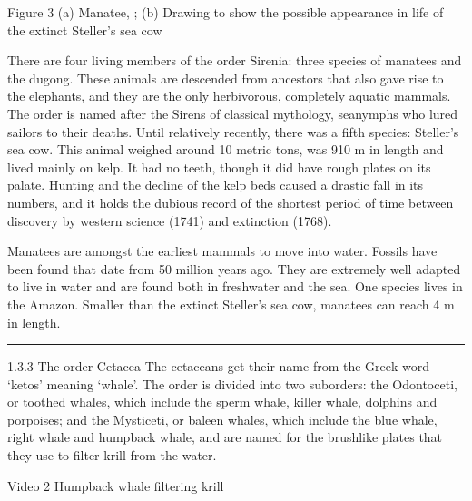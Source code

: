 \documentclass[letterpaper,10pt,english]{sphinxmanual}
\let\sphinxpxdimen\pdfpxdimen\else\newdimen\sphinxpxdimen
\begin{document}
\sphinxincludegraphics[width=512\sphinxpxdimen,height=164\sphinxpxdimen]{{s182_11_figure_3_composite}.jpg}

Figure 3 (a) Manatee, ; (b) Drawing to show the possible appearance in life of the extinct Steller’s sea cow

There are four living members of the order Sirenia: three species of manatees and the dugong. These animals are descended from ancestors that also gave rise to the elephants, and they are the only herbivorous, completely aquatic mammals. The order is named after the Sirens of classical mythology, sea\sphinxhyphen{}nymphs who lured sailors to their deaths. Until relatively recently, there was a fifth species: Steller’s sea cow. This animal weighed around 10 metric tons, was 9\textendash{}10 m in length and lived mainly on
kelp. It had no teeth, though it did have rough plates on its palate. Hunting and the decline of the kelp beds caused a drastic fall in its numbers, and it holds the dubious record of the shortest period of time between discovery by western science (1741) and extinction (1768).

Manatees are amongst the earliest mammals to move into water. Fossils have been found that date from 50 million years ago. They are extremely well adapted to live in water and are found both in freshwater and the sea. One species lives in the Amazon. Smaller than the extinct Steller’s sea cow, manatees can reach 4 m in length.


\bigskip\hrule\bigskip


1.3.3 The order Cetacea The cetaceans get their name from the Greek word ‘ketos’ meaning ‘whale’. The order is divided into two suborders: the Odontoceti, or toothed whales, which include the sperm whale, killer whale, dolphins and porpoises; and the Mysticeti, or baleen whales, which include the blue whale, right whale and humpback whale, and are named for the brush\sphinxhyphen{}like plates that they use to filter krill from the water.

Video 2 Humpback whale filtering krill
\end{document}
